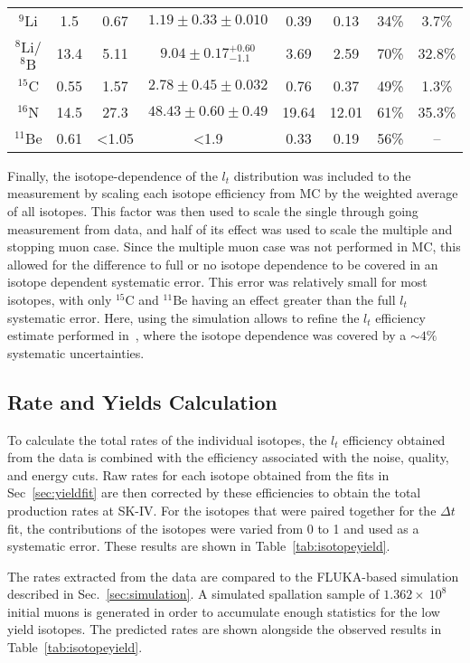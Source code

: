 \begin{table*}[t]
\begin{tabular}{c|cc|ccc|cc}
$^{9}\mbox{Li}$ & 1.5 & 0.67 & $1.19\pm0.33\pm0.010$ &0.39  & 0.13 & 34\% & 3.7\% \\
$^{8}\mbox{Li}$/$^{8}\mbox{B}$ & 13.4 & 5.11 & $9.04\pm0.17^{+0.60}_{-1.1}$ & 3.69 & 2.59 & 70\% & 32.8\% \\
$^{15}\mbox{C}$ & 0.55 & 1.57 & $2.78\pm0.45\pm0.032$ & 0.76 & 0.37 & 49\% & 1.3\% \\
$^{16}\mbox{N}$ & 14.5 & 27.3 & $48.43\pm0.60\pm0.49$  & 19.64 & 12.01 & 61\% & 35.3\% \\
$^{11}\mbox{Be}$ & 0.61 & \textless1.05 & \textless1.9  & 0.33 & 0.19 & 56\% & -- \\
   \bottomrule        %
   \end{tabular}
    \label{tab:isotopeyield}
\end{table*}
Finally, the isotope-dependence of the $l_t$ distribution was included to the measurement by scaling each isotope efficiency from MC by the weighted average of all isotopes. This factor was then used to scale the single through going measurement from data, and half of its effect was used to scale the multiple and stopping muon case. Since the multiple muon case was not performed in MC, this allowed for the difference to full or no isotope dependence to be covered in an isotope dependent systematic error. This error was relatively small for most isotopes, with only $^{15}\mbox{C}$ and $^{11}\mbox{Be}$ having an effect greater than the full $l_t$ systematic error.  
Here, using the simulation allows to refine the $l_t$ efficiency estimate performed in~\cite{SKspall_zhang}, where the isotope dependence was covered by a $\sim 4\%$ systematic uncertainties.


\subsection{Rate and Yields Calculation}
To calculate the total rates of the individual isotopes, the $l_t$ efficiency obtained from the data is combined with the efficiency associated with the noise, quality, and energy cuts. Raw rates for each isotope obtained from the fits in Sec~\ref{sec:yieldfit} are then corrected by these efficiencies to obtain the total production rates at SK-IV. For the isotopes that were paired together for the $\Delta t$ fit, the contributions of the isotopes were varied from 0 to 1 and used as a systematic error. These results are shown in Table~\ref{tab:isotopeyield}. 

The rates extracted from the data are compared to the FLUKA-based simulation described in Sec.~\ref{sec:simulation}. A simulated spallation sample of $1.362\times~10^8$ initial muons is generated in order to accumulate enough statistics for the low yield isotopes. The predicted rates are shown alongside the observed results in Table~\ref{tab:isotopeyield}. 


